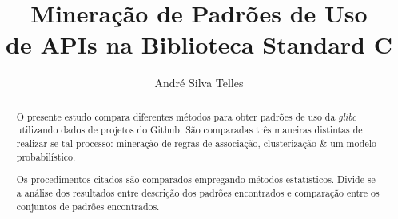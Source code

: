 \documentclass[11pt,twoside]{article}
\begin{document}



  \TRMakeCover

  \pagestyle{myheadings}

  \title{Mineração de Padrões de Uso \\ de APIs na Biblioteca Standard C}

  \author{André Silva Telles}

  \date{}

  \maketitle

  \begin{abstract} 
    O presente estudo compara diferentes métodos para obter padrões de uso da
    \textit{glibc} utilizando dados de projetos do Github. São comparadas três
    maneiras distintas de realizar-se tal processo: mineração de regras de
    associação, clusterização \& um modelo probabilístico.

    Os procedimentos citados são comparados empregando métodos estatísticos.
    Divide-se a análise dos resultados entre descrição dos padrões encontrados e
    comparação entre os conjuntos de padrões encontrados.
  \end{abstract}

  
  
  
  
  
  
  
  

  
  
\end{document}
